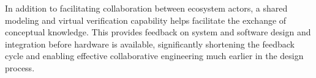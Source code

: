 In addition to facilitating collaboration between ecosystem actors, a shared modeling and virtual verification capability helps facilitate the exchange of conceptual knowledge. This provides feedback on system and software design and integration before hardware is available, significantly shortening the feedback cycle and enabling effective collaborative engineering much earlier in the design process.


